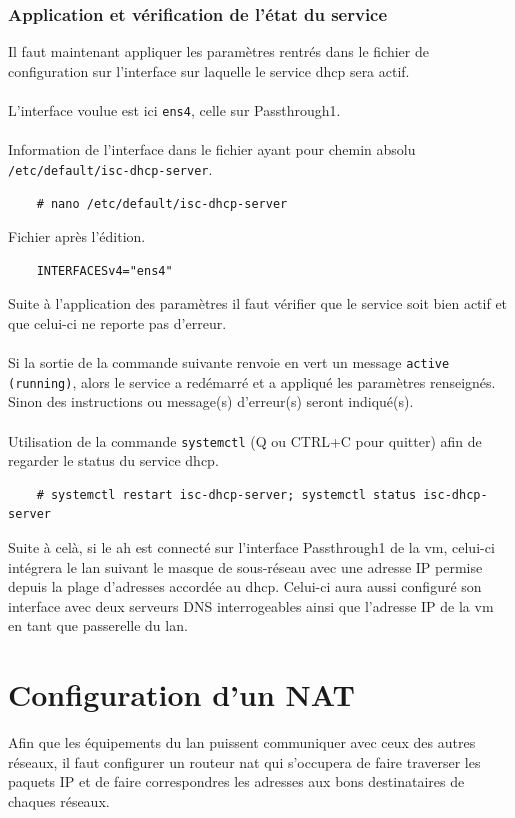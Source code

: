 \documentclass[a4paper]{article}
\begin{document}
\subsubsection{Application et vérification de l'état du service}
Il faut maintenant appliquer les paramètres rentrés dans le fichier de configuration sur l'interface sur laquelle le service \gls{dhcp} sera actif.\\\\L'interface voulue est ici \verb|ens4|, celle sur Passthrough1.\\\\Information de l'interface dans le fichier ayant pour chemin absolu \verb|/etc/default/isc-dhcp-server|.
\begin{lstlisting}
    # nano /etc/default/isc-dhcp-server
\end{lstlisting}
Fichier après l'édition.
\begin{lstlisting}
    INTERFACESv4="ens4"
\end{lstlisting}
Suite à l'application des paramètres il faut vérifier que le service soit bien actif et que celui-ci ne reporte pas d'erreur.\\\\Si la sortie de la commande suivante renvoie en vert un message \verb|active (running)|, alors le service a redémarré et a appliqué les paramètres renseignés. Sinon des instructions ou message(s) d'erreur(s) seront indiqué(s).\\\\Utilisation de la commande \verb|systemctl| (Q ou CTRL+C pour quitter) afin de regarder le status du service \gls{dhcp}.
\begin{lstlisting}
    # systemctl restart isc-dhcp-server; systemctl status isc-dhcp-server
\end{lstlisting}
Suite à celà, si le \acrshort{ah} est connecté sur l'interface Passthrough1 de la \acrshort{vm}, celui-ci intégrera le \gls{lan} suivant le masque de sous-réseau avec une adresse IP permise depuis la plage d'adresses accordée au \gls{dhcp}. Celui-ci aura aussi configuré son interface avec deux serveurs DNS interrogeables ainsi que l'adresse IP de la \acrshort{vm} en tant que passerelle du \gls{lan}.
\section{Configuration d'un NAT}
Afin que les équipements du \gls{lan} puissent communiquer avec ceux des autres réseaux, il faut configurer un routeur \gls{nat} qui s'occupera de faire traverser les paquets IP et de faire correspondres les adresses aux bons destinataires de chaques réseaux.
\end{document}
